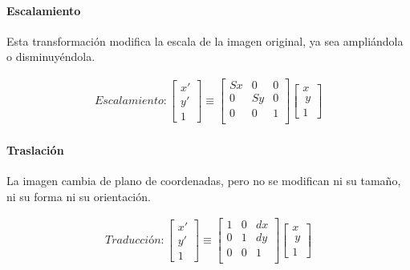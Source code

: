 \paragraph{Escalamiento} 

Esta transformación modifica la escala de la imagen original, ya sea ampliándola o disminuyéndola.

\label{img:transformacion-escalamiento}


\begin{gather}
	Escalamiento:
	\begin{bmatrix} x' \\ y' \\ 1 \end{bmatrix}
	\equiv
	 \begin{bmatrix}
	  Sx & 0 & 0 \\
	  0 & Sy & 0 \\
	  0 & 0 & 1 \\
	  \end{bmatrix}
	  \begin{bmatrix} x \\\ y \\ 1 \end{bmatrix}
\end{gather}

\paragraph{Traslación}

La imagen cambia de plano de coordenadas, pero no se modifican ni su tamaño, ni su forma ni su orientación.

\label{img:transformacion-traslacion}

\begin{gather}
	Traducción:
	\begin{bmatrix} x' \\ y' \\ 1 \end{bmatrix}
	\equiv
	 \begin{bmatrix}
	  1 & 0 & dx \\
	  0 & 1 & dy \\
	  0 & 0 & 1 \\
	  \end{bmatrix}
	  \begin{bmatrix} x \\\ y \\ 1 \end{bmatrix}
\end{gather}


